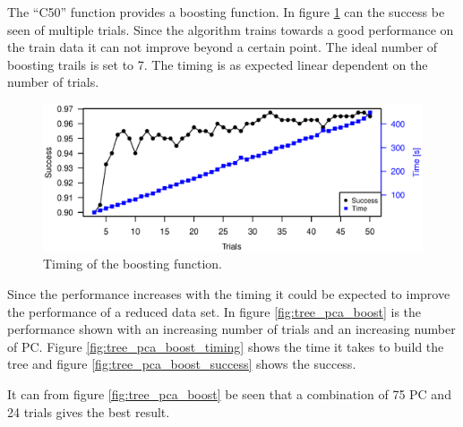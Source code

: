 The ``C50'' function provides a boosting function.
In figure \ref{fig:tree_timing} can the success be seen of multiple trials.
Since the algorithm trains towards a good performance on the train data it can not improve beyond a certain point.
The ideal number of boosting trails is set to 7.
The timing is as expected linear dependent on the number of trials.

\begin{figure}[H]
\includegraphics[width = \textwidth]{graphics/tree_timing_one}
\caption[Timing of the boosting function.]{Timing of the boosting function.}
\label{fig:tree_timing}
\end{figure}

Since the performance increases with the timing it could be expected to improve the performance of a reduced data set.
In figure \ref{fig:tree_pca_boost} is the performance shown with an increasing number of trials and an increasing number of PC.
Figure \ref{fig:tree_pca_boost_timing} shows the time it takes to build the tree and figure \ref{fig:tree_pca_boost_success} shows the success.

It can from figure \ref{fig:tree_pca_boost} be seen that a combination of 75 PC and 24 trials gives the best result.

